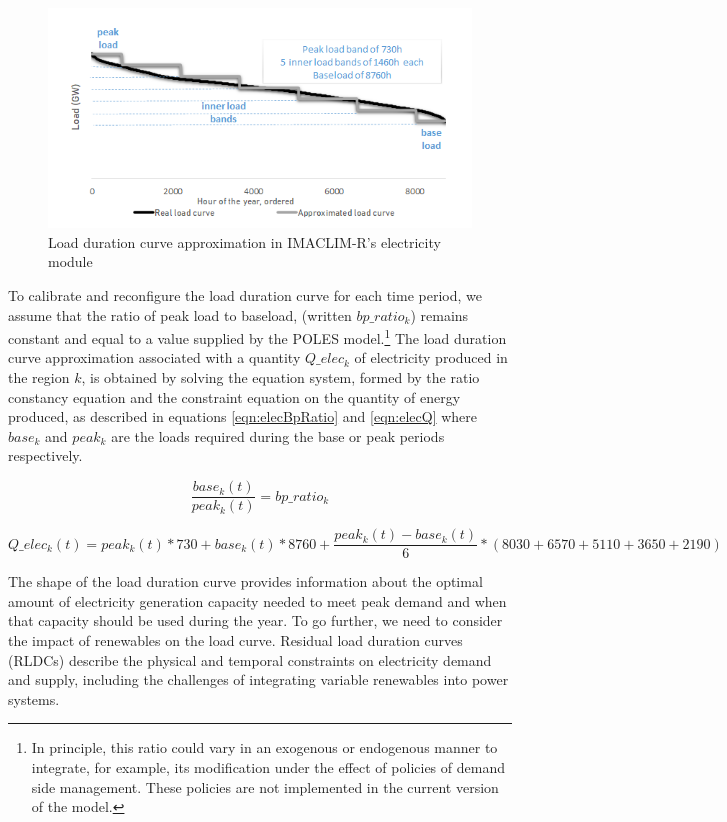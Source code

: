 \begin{figure}
    \includegraphics{figures&tables/LDC.png}
    \caption{Load duration curve approximation in IMACLIM-R's electricity module}
    \centering
    \label{fig:LDC}
\end{figure}


To calibrate and reconfigure the load duration curve for each time period, we assume that the ratio of peak load to baseload, (written $bp\_ratio_k$) remains constant and equal to a value supplied by the POLES model.\footnote{
    In principle, this ratio could vary in an exogenous or endogenous manner to integrate, for example, its modification under the effect of policies of demand side management. These policies are not implemented in the current version of the model.
}
The load duration curve approximation associated with a quantity $Q\_elec_k$ of electricity produced in the region $k$, is obtained by solving the equation system, formed by the ratio constancy equation and the constraint equation on the quantity of energy produced, as described in equations \ref{eqn:elecBpRatio} and  \ref{eqn:elecQ}
where $base_k$ and $peak_k$ are the loads required during the base or peak periods respectively.

\begin{dmath}
    \frac{base_k(t)}{peak_k(t)} = bp\_ratio_k
    \label{eqn:elecBpRatio}
\end{dmath}

\begin{dmath}
    Q\_elec_k(t) =
    peak_k(t) * 730 +
    base_k(t) * 8760 + \frac{peak_k(t) - base_k(t)}{6} * ( 8030 + 6570 + 5110 + 3650 + 2190)
    \label{eqn:elecQ}
\end{dmath}

The shape of the load duration curve provides information about the optimal amount of electricity generation capacity needed to meet peak demand and when that capacity should be used during the year. To go further, we need to consider the impact of renewables on the load curve. Residual load duration curves (RLDCs) describe the physical and temporal constraints on electricity demand and supply, including the challenges of integrating variable renewables into power systems.

